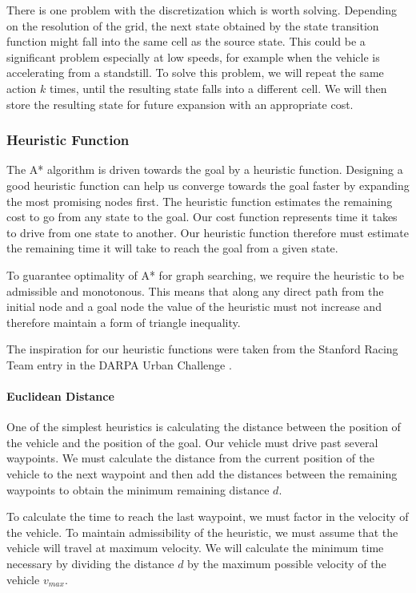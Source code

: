 There is one problem with the discretization which is worth solving. Depending on the resolution of the grid, the next state obtained by the state transition function might fall into the same cell as the source state. This could be a significant problem especially at low speeds, for example when the vehicle is accelerating from a standstill. To solve this problem, we will repeat the same action $k$ times, until the resulting state falls into a different cell. We will then store the resulting state for future expansion with an appropriate cost.

\subsubsection{Heuristic Function}

The A* algorithm is driven towards the goal by a heuristic function. Designing a good heuristic function can help us converge towards the goal faster by expanding the most promising nodes first. The heuristic function estimates the remaining cost to go from any state to the goal. Our cost function represents time it takes to drive from one state to another. Our heuristic function therefore must estimate the remaining time it will take to reach the goal from a given state.

To guarantee optimality of A* for graph searching, we require the heuristic to be admissible and monotonous. This means that along any direct path from the initial node and a goal node the value of the heuristic must not increase and therefore maintain a form of triangle inequality.

The inspiration for our heuristic functions were taken from the Stanford Racing Team entry in the DARPA Urban Challenge \cite{dolgov08gppSTAIR}.

\paragraph{Euclidean Distance}
One of the simplest heuristics is calculating the distance between the position of the vehicle and the position of the goal. Our vehicle must drive past several waypoints. We must calculate the distance from the current position of the vehicle to the next waypoint and then add the distances between the remaining waypoints to obtain the minimum remaining distance $d$.

To calculate the time to reach the last waypoint, we must factor in the velocity of the vehicle. To maintain admissibility of the heuristic, we must assume that the vehicle will travel at maximum velocity. We will calculate the minimum time necessary by dividing the distance $d$ by the maximum possible velocity of the vehicle $v_{max}$.

